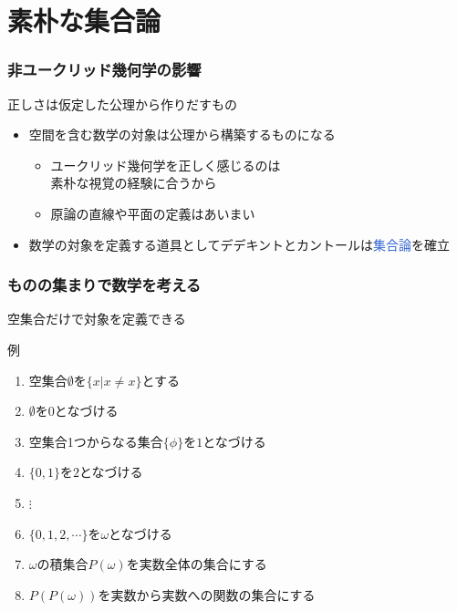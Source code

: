 \documentclass[unicode, 14pt, aspectratio=169]{beamer}
\begin{document}
\section{素朴な集合論}
\begin{frame}
  \frametitle{非ユークリッド幾何学の影響}
  {\large 正しさは仮定した公理から作りだすもの}
  \begin{itemize}
  \item 空間を含む数学の対象は公理から構築するものになる
    \begin{itemize}
    \item ユークリッド幾何学を正しく感じるのは\\素朴な視覚の経験に合うから
    \item 原論の直線や平面の定義はあいまい
    \end{itemize}
  \item 数学の対象を定義する道具としてデデキントとカントールは\textcolor{highlight}{集合論}を確立
  \end{itemize}
\end{frame}
\begin{frame}
  \frametitle{ものの集まりで数学を考える}
  {\large 空集合だけで対象を定義できる}
  \par
  例
  \begin{enumerate}
  \item 空集合$\emptyset$を$\{x|x\neq x\}$とする
  \item $\emptyset$を$0$となづける
  \item 空集合1つからなる集合$\{\phi\}$を$1$となづける
  \item $\{0, 1\}$を$2$となづける
  \item $\vdots$
  \item $\{0, 1, 2, \cdots\}$を$\omega$となづける
  \item $\omega$の積集合$P(\omega)$を実数全体の集合にする
  \item $P(P(\omega))$を実数から実数への関数の集合にする
  \end{enumerate}
\end{frame}
\end{document}
